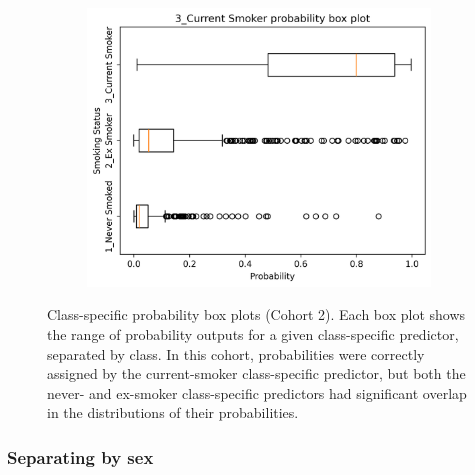 \documentclass{article} %
\begin{document}
\begin{figure}[tb]
\begin{subfigure}{0.48\linewidth}
    \end{subfigure}
    \begin{subfigure}{0.48\linewidth}
        \centering
        \includegraphics[width=\linewidth]{cohort2/test_boxplot_3.png}
    \end{subfigure}
    \caption[Class-specific probability box plots (Cohort 2)]{Class-specific probability box plots (Cohort 2). Each box plot shows the range of probability outputs for a given class-specific predictor, separated by class. In this cohort, probabilities were correctly assigned by the current-smoker class-specific predictor, but both the never- and ex-smoker class-specific predictors had significant overlap in the distributions of their probabilities.}
    \label{fig:cohort2-boxplots}
\end{figure}

\newpage
\subsubsection{Separating by sex}
\end{document}
